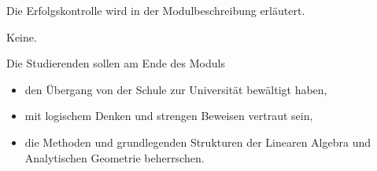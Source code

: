 \begin{course}

\setdoclanguagegerman
{}



\coursehead


\label{cour_7565.dp_997}


\begin{styleenv}
\begin{assessment}
Die Erfolgskontrolle wird in der Modulbeschreibung erläutert.


\end{assessment}

\begin{conditions}Keine.\end{conditions}


\end{styleenv}

\begin{learningoutcomes}
Die Studierenden sollen am Ende des Moduls

 \begin{itemize}\item den Übergang von der Schule zur Universität bewältigt haben,  \item mit logischem Denken und strengen Beweisen vertraut sein,   \item die Methoden und grundlegenden Strukturen der Linearen Algebra und Analytischen Geometrie beherrschen.  \end{itemize}
\end{learningoutcomes}


\end{course}
